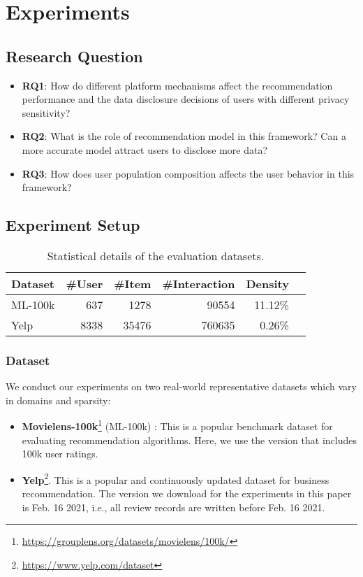 \section{Experiments}

\subsection{Research Question}
\begin{itemize}[itemsep=5pt, topsep=12pt,]
    \item \textbf{RQ1}: How do different platform mechanisms affect the recommendation performance and the data disclosure decisions of users with different privacy sensitivity?
    \item \textbf{RQ2}: What is the role of recommendation model in this framework? Can a more accurate model attract users to disclose more data?
    \item \textbf{RQ3}: How does user population composition affects the user behavior in this framework?
\end{itemize}
    

\subsection{Experiment Setup}


\begin{table}
    \centering
    \caption{Statistical details of the evaluation datasets.}
    \label{tab:dataset}
    \begin{tabular}{lrrrrr}
\toprule
Dataset & \#User & \#Item  & \#Interaction & Density \\ \midrule
ML-100k &637&   1278   & \num{90554}   & 11.12\%   \\ 
Yelp &    8338 &  \num{35476}   &  \num{760635}  & 0.26\%    \\
\bottomrule
\end{tabular}
\end{table}

\subsubsection{Dataset}
 We conduct our experiments on two real-world representative datasets which vary in domains and sparsity:
\begin{itemize}
    \item \textbf{Movielens-100k}\footnote{\url{https://grouplens.org/datasets/movielens/100k/}} (ML-100k) \cite{Harper:TIIS16:MovieLens}: This is a popular benchmark dataset for evaluating recommendation algorithms. Here, we use the version that includes 100k user ratings.
    \item \textbf{Yelp}\footnote{\url{https://www.yelp.com/dataset}}. This is a popular and continuously updated dataset for business recommendation. The version we download for the experiments in this paper is Feb. 16 2021, i.e., all review records are written before Feb. 16 2021.
\end{itemize}

